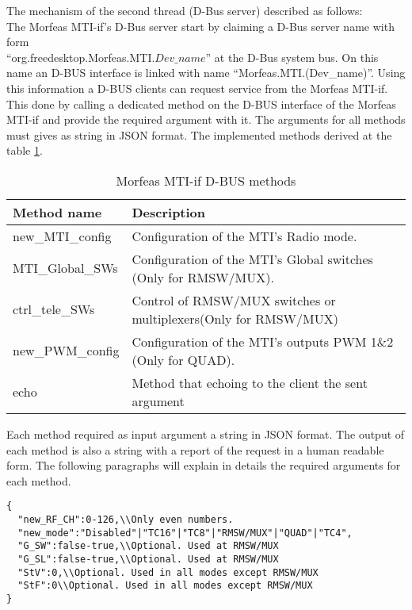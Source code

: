 The mechanism of the second thread (D-Bus server) described as follows:\\
The Morfeas MTI-if's D-Bus server start by claiming a D-Bus server name with form \\``org.freedesktop.Morfeas.MTI.\(Dev\_name\)'' at the D-Bus system bus.
On this name an D-BUS interface is linked with name ``Morfeas.MTI.(Dev\_name)''.
Using this information a D-BUS clients can request service from the Morfeas MTI-if.
This done by calling a dedicated method on the D-BUS interface of the Morfeas MTI-if and provide the required argument with it.
The arguments for all methods must gives as string in JSON format.
The implemented methods derived at the table \ref{tab:MTI-if_D-BUS_methods}.
\begin{table}[h!]
  \begin{center}
    \begin{tabular}{|l|l|}
      \hline
	  \textbf{Method name} & \textbf{Description}\\
      \hline
      new\_MTI\_config & Configuration of the MTI's Radio mode.\\
      MTI\_Global\_SWs & Configuration of the MTI's Global switches (Only for RMSW/MUX).\\
	  ctrl\_tele\_SWs & Control of RMSW/MUX switches or multiplexers(Only for RMSW/MUX)\\
      new\_PWM\_config & Configuration of the MTI's outputs PWM 1\&2 (Only for QUAD).\\
	  echo & Method that echoing to the client the sent argument\\
	  \hline
    \end{tabular}
	\caption{Morfeas MTI-if D-BUS methods}
	\label{tab:MTI-if_D-BUS_methods}
  \end{center}
\end{table}

Each method required as input argument a string in JSON format. The output of each method is also a string with a report of the request in a human readable form.
The following paragraphs will explain in details the required arguments for each method.

\begin{lstlisting}[frame=single,caption=Argument for new\_MTI\_config()]
{
  "new_RF_CH":0-126,\\Only even numbers.
  "new_mode":"Disabled"|"TC16"|"TC8"|"RMSW/MUX"|"QUAD"|"TC4",
  "G_SW":false-true,\\Optional. Used at RMSW/MUX
  "G_SL":false-true,\\Optional. Used at RMSW/MUX
  "StV":0,\\Optional. Used in all modes except RMSW/MUX
  "StF":0\\Optional. Used in all modes except RMSW/MUX
}
\end{lstlisting}

